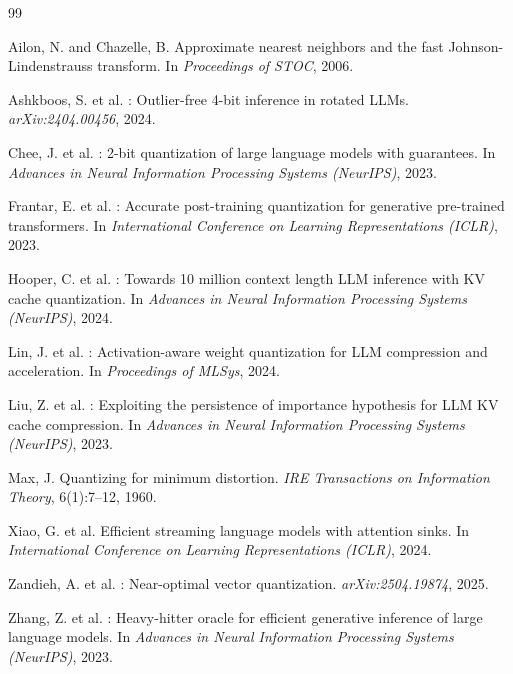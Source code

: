 \documentclass[11pt]{article}
\begin{document}
\clearpage
\begin{thebibliography}{99}

Ailon, N. and Chazelle, B.
\newblock Approximate nearest neighbors and the fast
  {J}ohnson-{L}indenstrauss transform.
\newblock In \emph{Proceedings of STOC}, 2006.

Ashkboos, S. et al.
: Outlier-free 4-bit inference in rotated {LLMs}.
\newblock \emph{arXiv:2404.00456}, 2024.

Chee, J. et al.
: 2-bit quantization of large language models with guarantees.
\newblock In \emph{Advances in Neural Information Processing Systems
  (NeurIPS)}, 2023.

Frantar, E. et al.
: Accurate post-training quantization for generative
  pre-trained transformers.
\newblock In \emph{International Conference on Learning Representations
  (ICLR)}, 2023.

Hooper, C. et al.
: Towards 10 million context length {LLM} inference with
  {KV} cache quantization.
\newblock In \emph{Advances in Neural Information Processing Systems
  (NeurIPS)}, 2024.

Lin, J. et al.
: Activation-aware weight quantization for {LLM} compression
  and acceleration.
\newblock In \emph{Proceedings of MLSys}, 2024.

Liu, Z. et al.
: Exploiting the persistence of importance hypothesis
  for {LLM} {KV} cache compression.
\newblock In \emph{Advances in Neural Information Processing Systems
  (NeurIPS)}, 2023.

Max, J.
\newblock Quantizing for minimum distortion.
\newblock \emph{IRE Transactions on Information Theory}, 6(1):7--12, 1960.

Xiao, G. et al.
\newblock Efficient streaming language models with attention sinks.
\newblock In \emph{International Conference on Learning Representations
  (ICLR)}, 2024.

Zandieh, A. et al.
: Near-optimal vector quantization.
\newblock \emph{arXiv:2504.19874}, 2025.

Zhang, Z. et al.
: Heavy-hitter oracle for efficient generative inference of
  large language models.
\newblock In \emph{Advances in Neural Information Processing Systems
  (NeurIPS)}, 2023.

\end{thebibliography}
\end{document}
